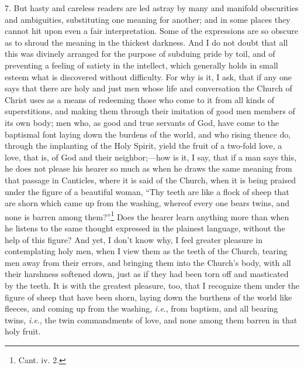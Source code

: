 7. But hasty and careless readers are led astray by many and manifold obscurities and ambiguities, substituting one meaning for another; and in some places they cannot hit upon even a fair interpretation. Some of the expressions are so obscure as to shroud the meaning in the thickest darkness. And I do not doubt that all this was divinely arranged for the purpose of subduing pride by toil, and of preventing a feeling of satiety in the intellect, which generally holds in small esteem what is discovered without difficulty. For why is it, I ask, that if any one says that there are holy and just men whose life and conversation the Church of Christ uses as a means of redeeming those who come to it from all kinds of superstitions, and making them through their imitation of good men members of its own body; men who, as good and true servants of God, have come to the baptismal font laying down the burdens of the world, and who rising thence do, through the implanting of the Holy Spirit, yield the fruit of a two-fold love, a love, that is, of God and their neighbor;—how is it, I say, that if a man says this, he does not please his hearer so much as when he draws the same meaning from that passage in Canticles, where it is said of the Church, when it is being praised under the figure of a beautiful woman, “Thy teeth are like a flock of sheep that are shorn which came up from the washing, whereof every one bears twins, and none is barren among them?”\footnote{Cant. iv. 2.} Does the hearer learn anything more than when he listens to the same thought expressed in the plainest language, without the help of this figure? And yet, I don’t know why, I feel greater pleasure in contemplating holy men, when I view them as the teeth of the Church, tearing men away from their errors, and bringing them into the Church’s body, with all their harshness softened down, just as if they had been torn off and masticated by the teeth. It is with the greatest pleasure, too, that I recognize them under the figure of sheep that have been shorn, laying down the burthens of the world like fleeces, and coming up from the washing, \emph{ i.e}., from baptism, and all bearing twins, \emph{i.e}., the twin commandments of love, and none among them barren in that holy fruit.

